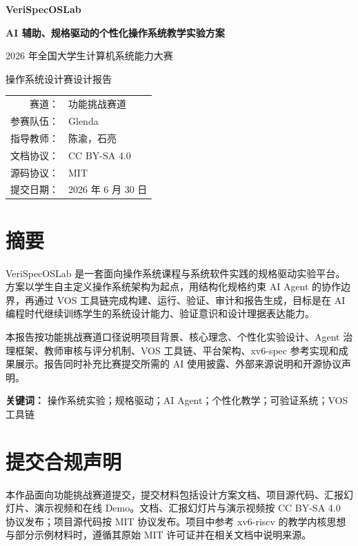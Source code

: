\documentclass[UTF8,a4paper,12pt,openany]{ctexrep}
\begin{document}
\setcounter{secnumdepth}{0}

\begin{titlepage}
\centering
\vspace*{2.4cm}
{\bfseries VeriSpecOSLab\par}
\vspace{0.6cm}
{\bfseries AI 辅助、规格驱动的个性化操作系统教学实验方案\par}
\vspace{1.2cm}
{2026 年全国大学生计算机系统能力大赛\par}
\vspace{0.3cm}
{操作系统设计赛设计报告\par}
\vfill
\begin{tabular}{rl}
赛道：& 功能挑战赛道 \\
参赛队伍：& Glenda \\
指导教师：& 陈渝，石亮 \\
文档协议：& CC BY-SA 4.0 \\
源码协议：& MIT \\
提交日期：& 2026 年 6 月 30 日 \\
\end{tabular}
\vspace*{1.8cm}
\end{titlepage}

\chapter*{摘要}
VeriSpecOSLab 是一套面向操作系统课程与系统软件实践的规格驱动实验平台。方案以学生自主定义操作系统架构为起点，用结构化规格约束 AI Agent 的协作边界，再通过 VOS 工具链完成构建、运行、验证、审计和报告生成，目标是在 AI 编程时代继续训练学生的系统设计能力、验证意识和设计理据表达能力。

本报告按功能挑战赛道口径说明项目背景、核心理念、个性化实验设计、Agent 治理框架、教师审核与评分机制、VOS 工具链、平台架构、xv6-spec 参考实现和成果展示。报告同时补充比赛提交所需的 AI 使用披露、外部来源说明和开源协议声明。

\noindent\textbf{关键词：} 操作系统实验；规格驱动；AI Agent；个性化教学；可验证系统；VOS 工具链

\chapter*{提交合规声明}
本作品面向功能挑战赛道提交，提交材料包括设计方案文档、项目源代码、汇报幻灯片、演示视频和在线 Demo。文档、汇报幻灯片与演示视频按 CC BY-SA 4.0 协议发布；项目源代码按 MIT 协议发布。项目中参考 xv6-riscv 的教学内核思想与部分示例材料时，遵循其原始 MIT 许可证并在相关文档中说明来源。
\end{document}
